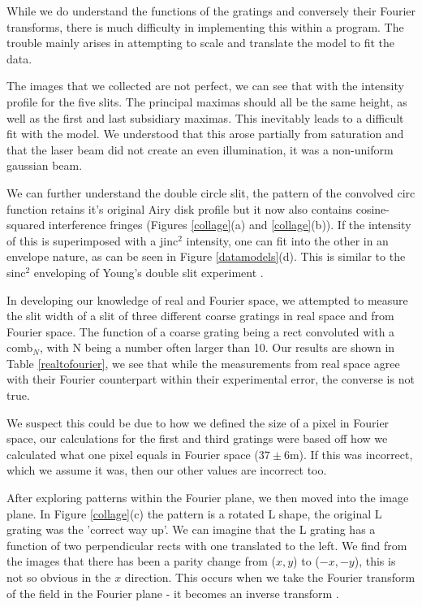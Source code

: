 \documentclass[twocolumn]{revtex4}
\begin{document}
While we do understand the functions of the gratings and conversely their Fourier transforms, there is much difficulty in implementing this within a program. The trouble mainly arises in attempting to scale and translate the model to fit the data. 

The images that we collected are not perfect, we can see that with the intensity profile for the five slits. The principal maximas should all be the same height, as well as the first and last subsidiary maximas. This inevitably leads to a difficult fit with the model. We understood that this arose partially from saturation and that the laser beam did not create an even illumination, it was a non-uniform gaussian beam.

We can further understand the double circle slit, the pattern of the convolved circ function retains it's original Airy disk profile but it now also contains cosine-squared interference fringes (Figures \ref{collage}(a) and \ref{collage}(b)). If the intensity of this is superimposed with a jinc$^2$ intensity, one can fit into the other in an envelope nature, as can be seen in Figure \ref{datamodels}(d). This is similar to the sinc$^2$ enveloping of Young's double slit experiment \cite{of2f}.

In developing our knowledge of real and Fourier space, we attempted to measure the slit width of a slit of three different coarse gratings in real space and from Fourier space. The function of a coarse grating being a rect convoluted with a comb$_N$, with N being a number often larger than 10. Our results are shown in Table \ref{realtofourier}, we see that while the measurements from real space agree with their Fourier counterpart within their experimental error, the converse is not true.

We suspect this could be due to how we defined the size of a pixel in Fourier space, our calculations for the first and third gratings were based off how we calculated what one pixel equals in Fourier space ($37\pm6$m). If this was incorrect, which we assume it was, then our other values are incorrect too.

After exploring patterns within the Fourier plane, we then moved into the image plane. In Figure \ref{collage}(c) the pattern is a rotated L shape, the original L grating was the 'correct way up'. We can imagine that the L grating has a function of two perpendicular rects with one translated to the left. We find from the images that there has been a parity change from ($x,y$) to ($-x,-y$), this is not so obvious in the $x$ direction. This occurs when we take the Fourier transform of the field in the Fourier plane - it becomes an inverse transform \cite{of2f}. 
\end{document}
